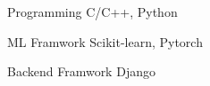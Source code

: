 

\begin{cvskills}

  \cvskill
    {Programming} %
    {C/C++, Python} %

  \cvskill
    {ML Framwork} %
    {Scikit-learn, Pytorch} %

  \cvskill
    {Backend Framwork} %
    {Django} %




\end{cvskills}
